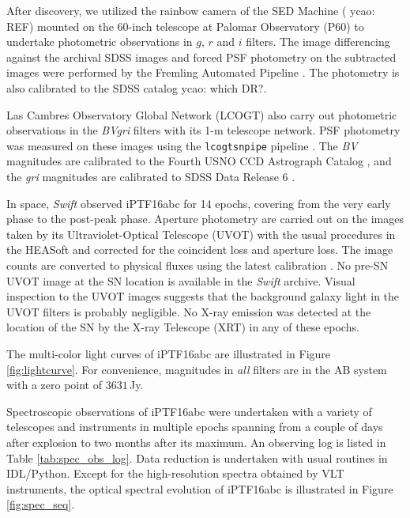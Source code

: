 \documentclass[twocolumn]{aastex61}
\newcommand{\ycao}[1]{{\color{red} ycao: {#1}}}
\begin{document}
After discovery, we utilized the rainbow camera of the SED Machine
(\ycao{REF}) mounted on the 60-inch telescope at Palomar Observatory
(P60) to undertake photometric observations in $g$, $r$ and $i$
filters. The image differencing against the archival SDSS images and
forced PSF photometry on the subtracted images were performed by the
Fremling Automated Pipeline \citep{2016A&A...593A..68F}. The
photometry is also calibrated to the SDSS catalog \ycao{which DR?}.

Las Cambres Observatory Global Network (LCOGT) also carry out
photometric observations in the \textit{BVgri} filters with its 1-m
telescope network.  PSF photometry was measured on these images using
the \texttt{lcogtsnpipe} pipeline \citep{2016MNRAS.459.3939V}. The
\textit{BV} magnitudes are calibrated to the Fourth USNO CCD
Astrograph Catalog \citep{2013AJ....145...44Z}, and the \textit{gri}
magnitudes are calibrated to SDSS Data Release 6
\citep{2008ApJS..175..297A}.

In space, \textit{Swift} observed iPTF16abc for 14 epochs, covering
from the very early phase to the post-peak phase. Aperture photometry
are carried out on the images taken by its Ultraviolet-Optical
Telescope (UVOT) with the usual procedures in the HEASoft and
corrected for the coincident loss and aperture loss. The image counts
are converted to physical fluxes using the latest calibration
\citep{2011AIPC.1358..373B}. No pre-SN UVOT image at the SN location
is available in the \textit{Swift} archive.  Visual inspection to the
UVOT images suggests that the background galaxy light in the UVOT
filters is probably negligible. No X-ray emission was detected at the
location of the SN by the X-ray Telescope (XRT) in any of these
epochs.

The multi-color light curves of iPTF16abc are illustrated in Figure
\ref{fig:lightcurve}.  For convenience, magnitudes in \textit{all}
filters are in the AB system with a zero point of $3631$\,Jy.

Spectroscopic observations of iPTF16abc were undertaken with a variety
of telescopes and instruments in multiple epochs spanning from a
couple of days after explosion to two months after its maximum. An
observing log is listed in Table \ref{tab:spec_obs_log}. Data
reduction is undertaken with usual routines in IDL/Python. Except for
the high-resolution spectra obtained by VLT instruments, the optical
spectral evolution of iPTF16abc is illustrated in Figure
\ref{fig:spec_seq}.
\end{document}
